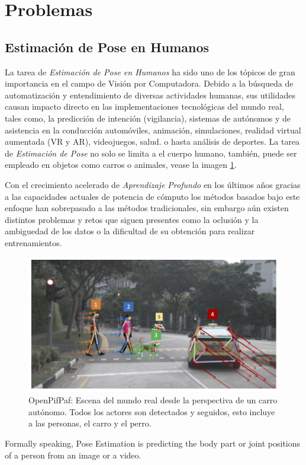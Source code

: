 \section{Problemas}

\subsection{Estimación de Pose en Humanos}

La tarea de \textit{Estimación de Pose en Humanos} ha sido uno de los tópicos de gran importancia en
el campo de Visión por Computadora. Debido a la búsqueda de automatización y entendimiento de
diversas actividades humanas, sus utilidades causan impacto directo en las implementaciones
tecnológicas del mundo real, tales como, la predicción de intención (vigilancia), sistemas de
autónomos y de asistencia en la conducción automóviles, animación, simulaciones, realidad virtual
aumentada (VR y AR), videojuegos, salud.
o hasta análisis de deportes. La tarea de \textit{Estimación de Pose} no solo se limita a el cuerpo
humano, también, puede ser empleado en objetos como carros o animales, vease la imagen \ref{fig:PE-track}.

Con el crecimiento acelerado de \textit{Aprendizaje Profundo} en los últimos años gracias a las
capacidades actuales de potencia de cómputo los métodos basados bajo este enfoque han sobrepasado
a las métodos tradicionales, sin embargo aún existen distintos problemas y retos que siguen presentes
como la oclusión y la ambiguedad de los datos o la dificultad de su obtención para realizar
entrenamientos.

\begin{figure}[ht!]
    \centering
    \includegraphics[width=0.4 \textwidth]{Chapters/1. Pose Estimation/figures/openpifpaf.png}
    \caption{OpenPifPaf: Escena del mundo real desde la perspectiva de un carro autónomo. Todos los actores
             son detectados y seguidos, esto incluye a las personas, el carro y el perro. \cite{DBLP:journals/corr/abs-2103-02440}}
    \label{fig:PE-track}
\end{figure}


Formally speaking, Pose Estimation is predicting the body part or joint positions of a person from
an image or a video.



